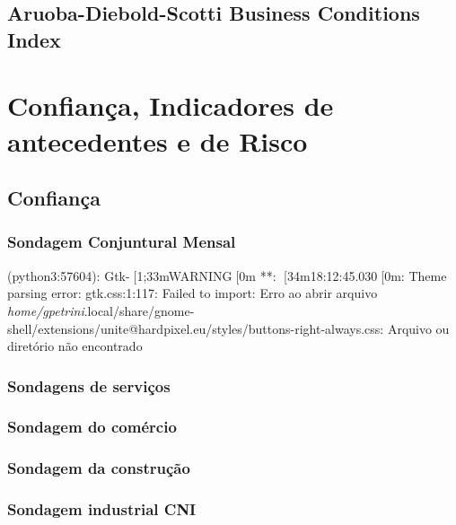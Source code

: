 \documentclass[11pt]{article}
\begin{document}
\subsection{Aruoba-Diebold-Scotti Business Conditions Index}
\label{sec:org837affa}

\section{Confiança, Indicadores de antecedentes e de Risco}
\label{sec:org3846c28}

\subsection{Confiança}
\label{sec:org394e9db}


\subsubsection{Sondagem Conjuntural Mensal}
\label{sec:orgdeb3413}



(python3:57604): Gtk-[1;33mWARNING[0m **: [34m18:12:45.030[0m: Theme parsing error: gtk.css:1:117: Failed to import: Erro ao abrir arquivo \emph{home/gpetrini}.local/share/gnome-shell/extensions/unite@hardpixel.eu/styles/buttons-right-always.css: Arquivo ou diretório não encontrado

\subsubsection{Sondagens de serviços}
\label{sec:orgbf5170e}


\subsubsection{Sondagem do comércio}
\label{sec:org8a61a96}

\subsubsection{Sondagem da construção}
\label{sec:org30b6aad}

\subsubsection{Sondagem industrial CNI}
\label{sec:orge4a9030}
\end{document}
